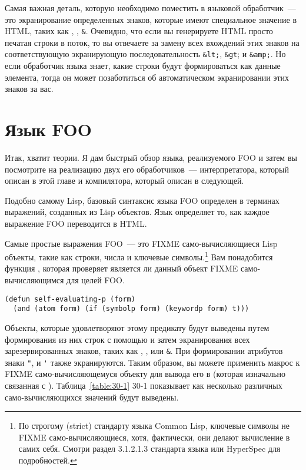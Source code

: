 Самая важная деталь, которую необходимо поместить в языковой обработчик~--- это
экранирование определенных знаков, которые имеют специальное значение в HTML, таких как
\code{<}, \code{>}, \lstinline!&!. Очевидно, что если вы генерируете HTML просто печатая
строки в поток, то вы отвечаете за замену всех вхождений этих знаков на соответствующую
экранирующую последовательность \lstinline!&lt;!, \lstinline!&gt!; и \lstinline!&amp;!. Но
если обработчик языка знает, какие строки будут формироваться как данные элемента, тогда
он может позаботиться об автоматическом экранировании этих знаков за вас.

\section{Язык FOO}

Итак, хватит теории. Я дам быстрый обзор языка, реализуемого FOO и затем вы посмотрите на
реализацию двух его обработчиков~--- интерпретатора, который описан в этой главе и
компилятора, который описан в следующей.

Подобно самому Lisp, базовый синтаксис языка FOO определен в терминах выражений, созданных
из Lisp объектов. Язык определяет то, как каждое выражение FOO переводится в HTML.

Самые простые выражения FOO~--- это FIXME само-вычисляющиеся Lisp объекты, такие как
строки, числа и ключевые символы.\footnote{По строгому (strict) стандарту языка Common
  Lisp, ключевые символы не FIXME само-вычисляющиеся, хотя, фактически, они делают
  вычисление в самих себя. Смотри раздел 3.1.2.1.3 стандарта языка или HyperSpec для
  подробностей.} Вам понадобится функция , которая проверяет
является ли данный объект FIXME само-вычисляющимся для целей FOO.

\begin{lstlisting}
(defun self-evaluating-p (form)
  (and (atom form) (if (symbolp form) (keywordp form) t)))
\end{lstlisting}

Объекты, которые удовлетворяют этому предикату будут выведены путем формирования из них
строк с помощью  и затем экранирования всех зарезервированных
знаков, таких как \code{<}, \code{>}, или \lstinline!&!. При формировании атрибутов знаки
\lstinline!"!, и \lstinline!'! также экранируются. Таким образом, вы можете применить
макрос  к FIXME само-вычисляющемуся объекту для вывода его в
 (которая изначально связанная с
). Таблица~\ref{table:30-1} 30-1 показывает как несколько
различных само-вычисляющихся значений будут выведены.

